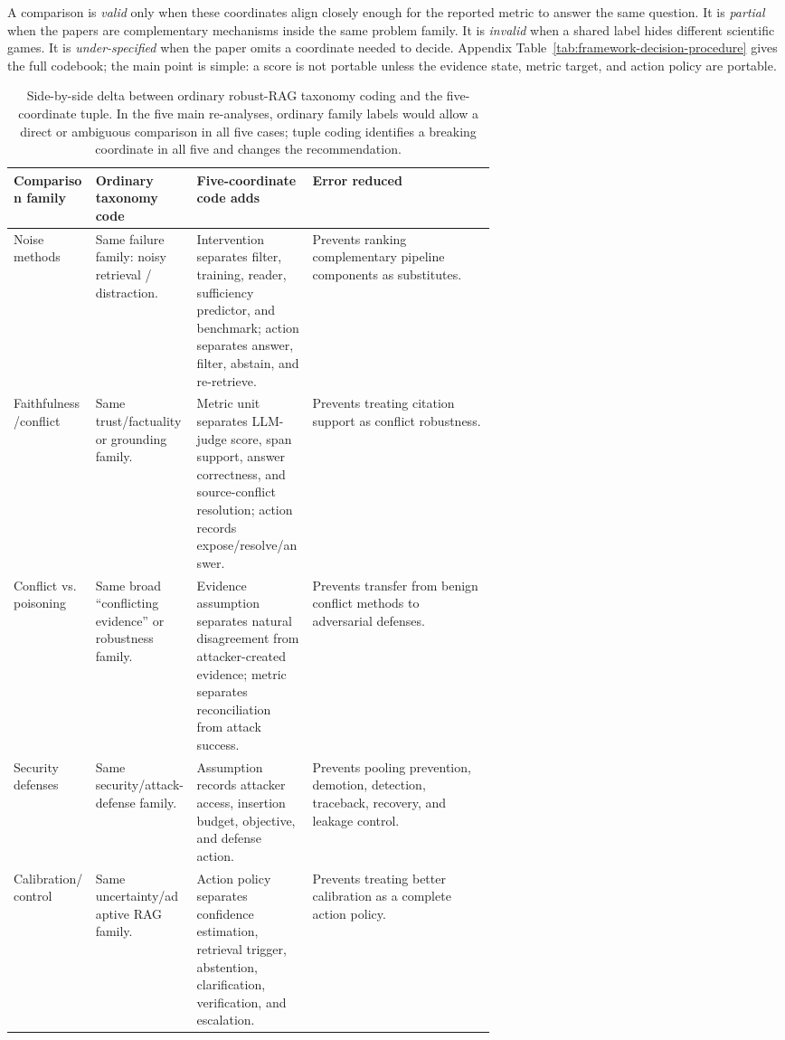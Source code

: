 \documentclass[11pt]{article}
\begin{document}
A comparison is \emph{valid} only when these coordinates align closely enough for the reported metric to answer the same question. It is \emph{partial} when the papers are complementary mechanisms inside the same problem family. It is \emph{invalid} when a shared label hides different scientific games. It is \emph{under-specified} when the paper omits a coordinate needed to decide. Appendix Table~\ref{tab:framework-decision-procedure} gives the full codebook; the main point is simple: a score is not portable unless the evidence state, metric target, and action policy are portable.

\begin{table}[t]
\centering
\scriptsize
\renewcommand{\arraystretch}{0.88}
\begin{tabularx}{\linewidth}{>{\raggedright\arraybackslash}p{0.17\linewidth}>{\raggedright\arraybackslash}p{0.21\linewidth}>{\raggedright\arraybackslash}p{0.24\linewidth}X}
\toprule
\textbf{Comparison family} & \textbf{Ordinary taxonomy code} & \textbf{Five-coordinate code adds} & \textbf{Error reduced} \\
\midrule
Noise methods & Same failure family: noisy retrieval / distraction. & Intervention separates filter, training, reader, sufficiency predictor, and benchmark; action separates answer, filter, abstain, and re-retrieve. & Prevents ranking complementary pipeline components as substitutes. \\
Faithfulness/conflict & Same trust/factuality or grounding family. & Metric unit separates LLM-judge score, span support, answer correctness, and source-conflict resolution; action records expose/resolve/answer. & Prevents treating citation support as conflict robustness. \\
Conflict vs. poisoning & Same broad ``conflicting evidence'' or robustness family. & Evidence assumption separates natural disagreement from attacker-created evidence; metric separates reconciliation from attack success. & Prevents transfer from benign conflict methods to adversarial defenses. \\
Security defenses & Same security/attack-defense family. & Assumption records attacker access, insertion budget, objective, and defense action. & Prevents pooling prevention, demotion, detection, traceback, recovery, and leakage control. \\
Calibration/control & Same uncertainty/adaptive RAG family. & Action policy separates confidence estimation, retrieval trigger, abstention, clarification, verification, and escalation. & Prevents treating better calibration as a complete action policy. \\
\bottomrule
\end{tabularx}
\caption{Side-by-side delta between ordinary robust-RAG taxonomy coding and the five-coordinate tuple. In the five main re-analyses, ordinary family labels would allow a direct or ambiguous comparison in all five cases; tuple coding identifies a breaking coordinate in all five and changes the recommendation.}
\label{tab:tuple-taxonomy-delta}
\end{table}
\end{document}
